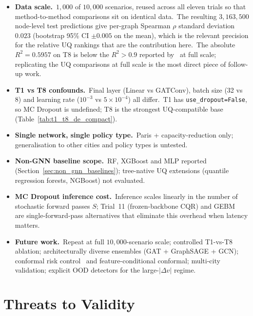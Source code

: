 \begin{itemize}
\item \textbf{Data scale.}\ $1{,}000$ of $10{,}000$ scenarios, reused across all eleven trials so that method-to-method comparisons sit on identical data.\ The resulting $3{,}163{,}500$ node-level test predictions give per-graph Spearman $\rho$ standard deviation $0.023$ (bootstrap 95\% CI $\pm 0.005$ on the mean), which is the relevant precision for the relative UQ rankings that are the contribution here.\ The absolute $R^2 = 0.5957$ on T8 is below the $R^2 > 0.9$ reported by~\textcite{natterer2025ml} at full scale; replicating the UQ comparisons at full scale is the most direct piece of follow-up work.
\item \textbf{T1 vs T8 confounds.}\label{sec:t1_vs_t8_limitation}\ Final layer (Linear vs GATConv), batch size (32 vs 8) and learning rate ($10^{-3}$ vs $5\times10^{-4}$) all differ.\ T1 has \texttt{use\_dropout=False}, so MC Dropout is undefined; T8 is the strongest UQ-compatible base (Table~\ref{tab:t1_t8_de_compact}).
\item \textbf{Single network, single policy type.}\ Paris + capacity-reduction only; generalisation to other cities and policy types is untested.
\item \textbf{Non-GNN baseline scope.}\ RF, XGBoost and MLP reported (Section~\ref{sec:non_gnn_baselines}); tree-native UQ extensions (quantile regression forests, NGBoost) not evaluated.
\item \textbf{MC Dropout inference cost.}\ Inference scales linearly in the number of stochastic forward passes $S$; Trial~11 (frozen-backbone CQR) and GEBM~\cite{fuchsgruber2024energy} are single-forward-pass alternatives that eliminate this overhead when latency matters.
\item \textbf{Future work.}\ Repeat at full $10{,}000$-scenario scale; controlled T1-vs-T8 ablation; architecturally diverse ensembles (GAT + GraphSAGE + GCN); conformal risk control~\cite{angelopoulos2023conformal} and feature-conditional conformal; multi-city validation; explicit OOD detectors for the large-$|\Delta v|$ regime.
\end{itemize}

\section{Threats to Validity}\label{sec:threats_to_validity}

